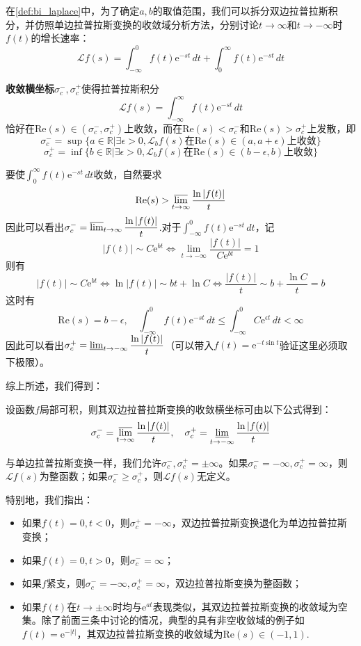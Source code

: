 在\cref{def:bi_laplace}中，为了确定$a,b$的取值范围，我们可以拆分双边拉普拉斯积分，并仿照单边拉普拉斯变换的收敛域分析方法，分别讨论$t\to\infty$和$t\to-\infty$时$f(t)$的增长速率：
\[\mathcal{L}f(s)=\int_{-\infty}^{0}f(t)\mathrm{e}^{-st}\,dt+\int_{0}^{\infty}f(t)\mathrm{e}^{-st}\,dt\]
\begin{definition}[收敛横坐标]\label{def:bi_convergence_abscissa}
    \textbf{收敛横坐标}$\sigma_{c}^-,\sigma_{c}^+$使得拉普拉斯积分$$\mathcal{L}f(s)=\int_{-\infty}^{\infty}f(t)\mathrm{e}^{-st}\,dt$$恰好在$\mathrm{Re}(s)\in(\sigma_{c}^-,\sigma_{c}^+)$上收敛，而在$\mathrm{Re}(s)<\sigma_{c}^-$和$\mathrm{Re}(s)>\sigma_{c}^+$上发散，即
    \[\sigma_{c}^-=\sup\{a\in\mathbb{R}|\exists\epsilon>0,\mathcal{L} _b f(s)\text{在}\mathrm{Re}(s)\in(a,a+\epsilon)\text{上收敛}\}\]
    \[\sigma_c^+=\inf\{b\in\mathbb{R}|\exists\epsilon>0,\mathcal{L} _b f(s)\text{在}\mathrm{Re}(s)\in(b-\epsilon,b)\text{上收敛}\}\]
\end{definition}
要使$\int_{0}^{\infty}f(t)\mathrm{e}^{-st}\,dt$收敛，自然要求
\[\mathrm{Re}(s)>\varlimsup_{t\to\infty}\frac{\ln|f(t)|}{t}\]
因此可以看出$\sigma_c^-=\varlimsup_{t\to\infty}\dfrac{\ln|f(t)|}{t}$.对于$\int_{-\infty}^{0}f(t)\mathrm{e}^{-st}\,dt$，记
\[|f(t)|\sim C \mathrm{e}^{b t}\iff \lim_{t\to -\infty}\frac{|f(t)|}{C \mathrm{e}^{bt}}=1\]
则有
$$|f(t)|\sim C \mathrm{e}^{b t}\iff \ln|f(t)|\sim b t + \ln C\iff \frac{|f(t)|}{t}\sim b+\frac{\ln C}{t}=b$$
这时有
$$\mathrm{Re}(s)=b-\epsilon,\quad\int_{-\infty}^{0}f(t)\mathrm{e}^{-st}\,dt\leq\int_{-\infty}^{0}C \mathrm{e}^{\epsilon t}\,dt<\infty$$
因此可以看出$\sigma_c^+=\varliminf_{t\to -\infty}\dfrac{\ln|f(t)|}{t}$（可以带入$f(t)=\mathrm{e}^{-t\sin t}$验证这里必须取下极限）。

综上所述，我们得到：\begin{theorem}
    设函数$f$局部可积，则其双边拉普拉斯变换的收敛横坐标可由以下公式得到：
    \[\sigma_{c}^-=\varlimsup_{t\to\infty}\frac{\ln|f(t)|}{t},\quad\sigma_{c}^+=\varliminf_{t\to -\infty}\frac{\ln|f(t)|}{t}\]
\end{theorem}

与单边拉普拉斯变换一样，我们允许$\sigma_{c}^-,\sigma_{c}^+=\pm\infty$。如果$\sigma_{c}^-=-\infty,\sigma_c^+=\infty$，则$\mathcal{L} f(s)$为整函数；如果$\sigma_{c}^-\geq\sigma_c^+$，则$\mathcal{L}f(s)$无定义。

特别地，我们指出：\begin{itemize}
    \item 如果$f(t)=0,t<0$，则$\sigma_{c}^+=-\infty$，双边拉普拉斯变换退化为单边拉普拉斯变换；
    \item 如果$f(t)=0,t>0$，则$\sigma_{c}^-=\infty$；
    \item 如果$f$紧支，则$\sigma_{c}^-=-\infty,\sigma_c^+=\infty$，双边拉普拉斯变换为整函数；
    \item 如果$f(t)$在$t\to\pm\infty$时均与$\mathrm{e}^{a t}$表现类似，其双边拉普拉斯变换的收敛域为空集。除了前面三条中讨论的情况，典型的具有非空收敛域的例子如$f(t)=\mathrm{e}^{-|t|}$，其双边拉普拉斯变换的收敛域为$\mathrm{Re}(s)\in(-1,1)$.
\end{itemize}

